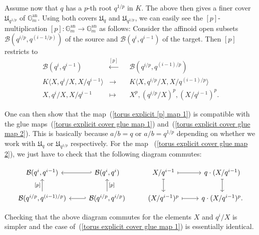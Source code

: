 \documentclass[10pt,oneside]{amsart}
\theoremstyle{definition}
\begin{document}
	Assume now that $q$ has a $p$-th root $q^{1/p}$ in $K$. The above then gives a finer cover $\mathfrak U_{q^{1/p}}$ of $\mathbb G_m^{\operatorname{an}}$. Using both covers $\mathfrak U_q$ and $\mathfrak U_{q^{1/p}}$, we can easily see the $[p]$-multiplication $[p]:\mathbb G_m^{\operatorname{an}}\rightarrow \mathbb G_m^{\operatorname{an}}$ as follows: Consider the affinoid open subsets $\mathcal B(q^{i/p},q^{(i-1/p)})$ of the source and  $\mathcal B(q^i,q^{i-1})$ of the target. Then $[p]$ restricts to
	\begin{equation}
	\begin{alignedat}{2} \label{torus explicit [p] map 1}
	\mathcal B(q^i,q^{i-1})&\xleftarrow{[p]}&& \mathcal B(q^{i/p},q^{(i-1)/p})\\
	K\langle X,q^i/X,X/q^{i-1}\rangle&\rightarrow &&K\langle X,q^{i/p}/X, X/q^{(i-1)/p}\rangle\\
	X,q^i/X, X/q^{i-1}&\mapsto&& X^p, (q^{i/p}/X)^p, (X/q^{i-1})^p.
	\end{alignedat}
	\end{equation}

	One can then show that the map~(\ref{torus explicit [p] map 1}) is compatible with the glue maps~(\ref{torus explicit cover glue map 1}) and~(\ref{torus explicit cover glue map 2}). This is basically because $a/b=q$ or $a/b=q^{1/p}$ depending on whether we work with $\mathfrak U_q$ or $\mathfrak U_{q^{1/p}}$ respectively. For the map ~(\ref{torus explicit cover glue map 2}), we just have to check that the following diagram commutes:
	\begin{center}
		\begin{equation}\label{diagram showing that [p]-multiplication on torus glues together}
		\begin{tikzcd}
			\mathcal B(q^i,q^{i-1}) & \mathcal B(q^i,q^i) \arrow[l, hook'] & X/q^{i-1} \arrow[r, maps to] \arrow[d, maps to] & q\cdot (X/q^{i-1})\arrow[d, maps to] \\
			\mathcal B(q^{i/p},q^{(i-1)/p}) \arrow[u, "{[p]}"] & \mathcal B(q^{i/p},q^{i/p}) \arrow[u, "{[p]}"'] \arrow[l, hook'] & (X/q^{i-1})^p \arrow[r, maps to] & q\cdot (X/q^{i-1})^p. 
		\end{tikzcd}
		\end{equation}
	\end{center} 
	Checking that the above diagram commutes for the elements $X$ and $q^i/X$ is simpler and the case of~(\ref{torus explicit cover glue map 1}) is essentially identical.
	
\end{document}
